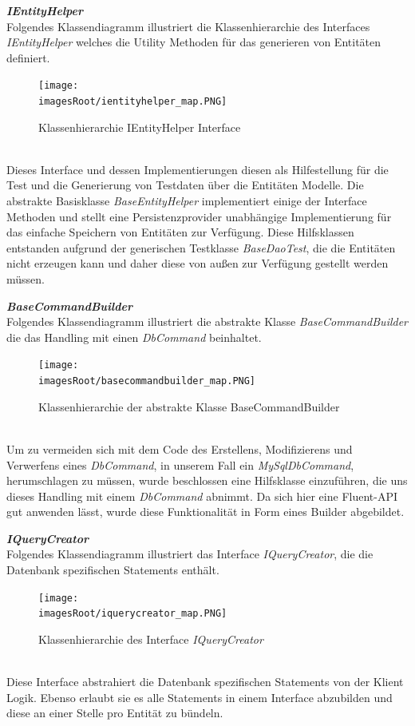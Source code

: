 \documentclass[11pt, a4paper, twoside]{article}   	%
\newcommand{\imagesRoot}{images}
\begin{document}
\newpage 
\textbf{\emph{IEntityHelper}}\\
Folgendes Klassendiagramm illustriert die Klassenhierarchie des Interfaces \emph{IEntityHelper} welches die Utility Methoden für das generieren von Entitäten definiert.
\begin{figure}[h]
	\centering
	\texttt{[image: \\imagesRoot/ientityhelper\_map.PNG]}
	\caption
	{Klassenhierarchie IEntityHelper Interface}
\end{figure}
\ \\
Dieses Interface und dessen Implementierungen diesen als Hilfestellung für die Test und die Generierung von Testdaten über die Entitäten Modelle. Die abstrakte Basisklasse \emph{BaseEntityHelper} implementiert einige der Interface Methoden und stellt eine Persistenzprovider unabhängige Implementierung für das einfache Speichern von Entitäten zur Verfügung. Diese Hilfsklassen entstanden aufgrund der generischen Testklasse \emph{BaseDaoTest}, die die Entitäten nicht erzeugen kann und daher diese von außen zur Verfügung gestellt werden müssen.

\newpage
\textbf{\emph{BaseCommandBuilder}}\\
Folgendes Klassendiagramm illustriert die abstrakte Klasse \emph{BaseCommandBuilder} die das Handling mit einen \emph{DbCommand} beinhaltet. 
\begin{figure}[h]
	\centering
	\texttt{[image: \\imagesRoot/basecommandbuilder\_map.PNG]}
	\caption
	{Klassenhierarchie der abstrakte Klasse BaseCommandBuilder}
\end{figure}
\ \\
Um zu vermeiden sich mit dem Code des Erstellens, Modifizierens und Verwerfens eines \emph{DbCommand}, in unserem Fall ein \emph{MySqlDbCommand}, herumschlagen zu müssen, wurde beschlossen eine Hilfsklasse einzuführen, die uns dieses Handling mit einem \emph{DbCommand} abnimmt.
Da sich hier eine Fluent-API gut anwenden lässt, wurde diese Funktionalität in Form eines Builder abgebildet.

\newpage
\textbf{\emph{IQueryCreator}}\\
Folgendes Klassendiagramm illustriert das Interface \emph{IQueryCreator}, die die Datenbank spezifischen Statements enthält.
\begin{figure}[h]
	\centering
	\texttt{[image: \\imagesRoot/iquerycreator\_map.PNG]}
	\caption
	{Klassenhierarchie des Interface \emph{IQueryCreator}}
\end{figure}
\ \\
Diese Interface abstrahiert die Datenbank spezifischen Statements von der Klient Logik. Ebenso erlaubt sie es alle Statements in einem Interface abzubilden und diese an einer Stelle pro Entität zu bündeln. 
\end{document}
